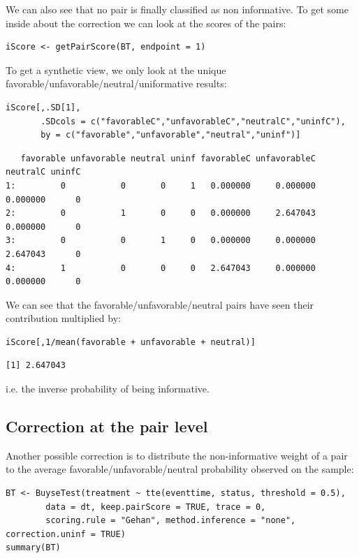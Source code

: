 \documentclass[12pt]{article}
\begin{document}
We can also see that no pair is finally classified as non
informative. To get some inside about the correction we can look at
the scores of the pairs:
\lstset{language=r,label= ,caption= ,captionpos=b,numbers=none}
\begin{lstlisting}
iScore <- getPairScore(BT, endpoint = 1)
\end{lstlisting}

To get a synthetic view, we only look at the unique
favorable/unfavorable/neutral/uniformative results:
\lstset{language=r,label= ,caption= ,captionpos=b,numbers=none}
\begin{lstlisting}
iScore[,.SD[1], 
       .SDcols = c("favorableC","unfavorableC","neutralC","uninfC"),
       by = c("favorable","unfavorable","neutral","uninf")]
\end{lstlisting}

\begin{verbatim}
   favorable unfavorable neutral uninf favorableC unfavorableC neutralC uninfC
1:         0           0       0     1   0.000000     0.000000 0.000000      0
2:         0           1       0     0   0.000000     2.647043 0.000000      0
3:         0           0       1     0   0.000000     0.000000 2.647043      0
4:         1           0       0     0   2.647043     0.000000 0.000000      0
\end{verbatim}


We can see that the favorable/unfavorable/neutral pairs have seen
their contribution multiplied by:
\lstset{language=r,label= ,caption= ,captionpos=b,numbers=none}
\begin{lstlisting}
iScore[,1/mean(favorable + unfavorable + neutral)]
\end{lstlisting}

\begin{verbatim}
[1] 2.647043
\end{verbatim}


i.e. the inverse probability of being informative. 

\subsection{Correction at the pair level}
\label{sec:orgd9a6ed8}

Another possible correction is to distribute the non-informative
weight of a pair to the average favorable/unfavorable/neutral
probability observed on the sample:
\lstset{language=r,label= ,caption= ,captionpos=b,numbers=none}
\begin{lstlisting}
BT <- BuyseTest(treatment ~ tte(eventtime, status, threshold = 0.5),
		data = dt, keep.pairScore = TRUE, trace = 0,
		scoring.rule = "Gehan", method.inference = "none", correction.uninf = TRUE)
summary(BT)
\end{lstlisting}
\end{document}
